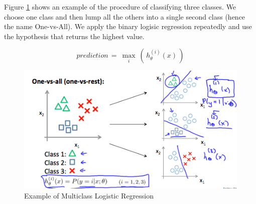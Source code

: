             Figure \ref{fig:multi-class-regression} shows an example of the procedure of classifying three classes. We choose one class and then lump all the others into a single second class (hence the name One-vs-All). We apply the binary logisic regression repeatedly and use the hypothesis that returns the highest value. 

            \begin{equation}
                prediction\,=\: \max_{i}\: (\, h_\theta ^{(i)} (x) \,)   
                \label{eq:max-log-regre}
            \end{equation}
            

            \begin{figure}[htbp]
                \centering
                \includegraphics[width=\textwidth]{image/multi-class.png}
                \caption{Example of Multiclass Logistic Regression}
                \label{fig:multi-class-regression}
            \end{figure}
